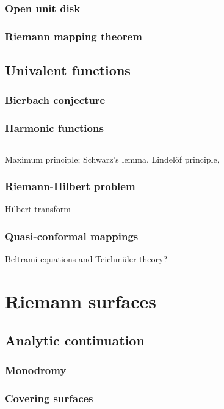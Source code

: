 \documentclass{../note}
\begin{document}
\section{Open unit disk}
\section{Riemann mapping theorem}


\chapter{Univalent functions}
\section{Bierbach conjecture}
\section{Harmonic functions}




\chapter{}

Maximum principle; Schwarz's lemma, Lindelöf principle,

\section{Riemann-Hilbert problem}
Hilbert transform

\section{Quasi-conformal mappings}
Beltrami equations and Teichm\"uler theory?





\part{Riemann surfaces}

\chapter{Analytic continuation}
\section{Monodromy}
\section{Covering surfaces}
\end{document}
